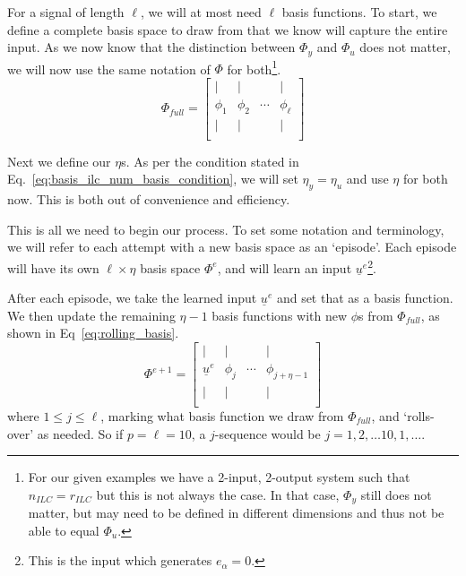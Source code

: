 For a signal of length $\ell$, we will at most need $\ell$ basis functions. To start, we define a complete basis space to draw from that we know will capture the entire input. As we now know that the distinction between $\Phi_y$ and $\Phi_u$ does not matter, we will now use the same notation of $\Phi$ for both\footnote{For our given examples we have a 2-input, 2-output system such that $n_{ILC} = r_{ILC}$ but this is not always the case. In that case, $\Phi_y$ still does not matter, but may need to be defined in different dimensions and thus not be able to equal $\Phi_u$.}.
\begin{equation}
    \Phi_{full} =
    \begin{bmatrix}
        | & | &  & | \\
        \phi_1 & \phi_2 & \cdots & \phi_{\ell} \\
        | & | &  & | \\
    \end{bmatrix}
    \label{eq:full_basis_space_phi}
\end{equation}

Next we define our $\eta$s. As per the condition stated in Eq.~\ref{eq:basis_ilc_num_basis_condition}, we will set $\eta_y = \eta_u$ and use $\eta$ for both now. This is both out of convenience and efficiency.

This is all we need to begin our process. To set some notation and terminology, we will refer to each attempt with a new basis space as an `episode'. Each episode will have its own $\ell \times \eta$ basis space $\Phi^e$, and will learn an input $\underline{u}^e$\footnote{This is the input which generates $e_\alpha = 0$.}.

After each episode, we take the learned input $\underline{u}^e$ and set that as a basis function. We then update the remaining $\eta - 1$ basis functions with new $\phi$s from $\Phi_{full}$, as shown in Eq~\ref{eq:rolling_basis}.
\begin{equation}
    \Phi^{e+1} =
    \begin{bmatrix}
        | & | &  & | \\
        \underline{u}^e & \phi_j & \cdots & \phi_{j+\eta-1} \\
        | & | &  & | \\
    \end{bmatrix}
    \label{eq:rolling_basis}
\end{equation}
where $1 \leq j \leq \ell$, marking what basis function we draw from $\Phi_{full}$, and `rolls-over' as needed. So if $p=\ell=10$, a $j$-sequence would be $j = 1, 2, \dots 10, 1, \dots$.

